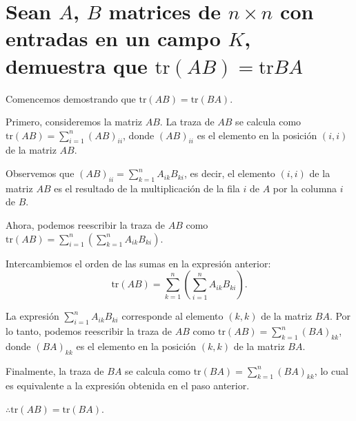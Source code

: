 \section{Sean $A$, $B$ matrices de $n \times n$ con entradas en un campo $K$, demuestra que $\text{tr}(AB)= \text{tr}BA$}

Comencemos demostrando que $\text{tr}(AB) = \text{tr}(BA)$.

Primero, consideremos la matriz $AB$. La traza de $AB$ se calcula como $\text{tr}(AB) = \sum_{i=1}^{n} (AB)_{ii}$, donde $(AB)_{ii}$ es el elemento en la posición $(i, i)$ de la matriz $AB$.

Observemos que $(AB)_{ii} = \sum_{k=1}^{n} A_{ik}B_{ki}$, es decir, el elemento $(i, i)$ de la matriz $AB$ es el resultado de la multiplicación de la fila $i$ de $A$ por la columna $i$ de $B$.

Ahora, podemos reescribir la traza de $AB$ como $\text{tr}(AB) = \sum_{i=1}^{n} \left(\sum_{k=1}^{n} A_{ik}B_{ki}\right)$.

Intercambiemos el orden de las sumas en la expresión anterior:
   $$\text{tr}(AB) = \sum_{k=1}^{n} \left(\sum_{i=1}^{n} A_{ik}B_{ki}\right).$$

La expresión $\sum_{i=1}^{n} A_{ik}B_{ki}$ corresponde al elemento $(k, k)$ de la matriz $BA$. Por lo tanto, podemos reescribir la traza de $AB$ como $\text{tr}(AB) = \sum_{k=1}^{n} (BA)_{kk}$, donde $(BA)_{kk}$ es el elemento en la posición $(k, k)$ de la matriz $BA$.

Finalmente, la traza de $BA$ se calcula como $\text{tr}(BA) = \sum_{k=1}^{n} (BA)_{kk}$, lo cual es equivalente a la expresión obtenida en el paso anterior.

$\therefore \text{tr}(AB) = \text{tr}(BA)$. 
